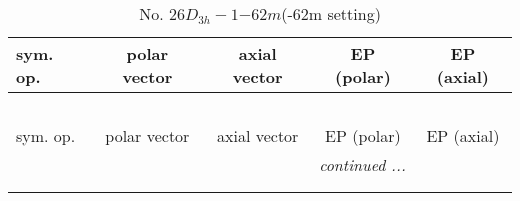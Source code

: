 \documentclass[fleqn,10pt,landscape]{jsarticle}
\begin{document}
\newpage
\begin{center}
\renewcommand{\arraystretch}{1.3}
\begin{longtable}{lcccc}
\caption{No. 26\quad$D_{3h}-1$\quad$-62m$\quad(-62m setting)\quad[ hexagonal ]}
 \\
 \hline \hline
sym. op. & polar vector & axial vector & EP (polar) & EP (axial) \\ \hline \endfirsthead

\multicolumn{4}{l}{\tablename\ \thetable{}} \\
 \hline \hline
sym. op. & polar vector & axial vector & EP (polar) & EP (axial) \\ \hline \endhead

 \hline \hline
\multicolumn{4}{r}{\footnotesize\it continued ...} \\ \endfoot

 \hline \hline
\multicolumn{4}{r}{} \\ \endlastfoot


\end{longtable}
\end{center}
\end{document}
